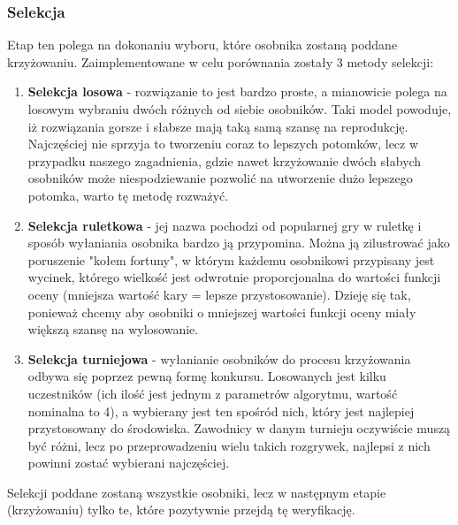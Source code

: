 \subsubsection{Selekcja}
Etap ten polega na dokonaniu wyboru, które osobnika zostaną poddane krzyżowaniu. Zaimplementowane w celu porównania zostały 3 metody selekcji:
\begin{enumerate}
\item \textbf{Selekcja losowa} - rozwiązanie to jest bardzo proste, a mianowicie polega na losowym wybraniu dwóch różnych od siebie osobników. Taki model powoduje, iż rozwiązania gorsze i słabsze mają taką samą szansę na reprodukcję. Najczęściej nie sprzyja to tworzeniu coraz to lepszych potomków, lecz w przypadku naszego zagadnienia, gdzie nawet krzyżowanie dwóch słabych osobników może niespodziewanie pozwolić na utworzenie dużo lepszego potomka, warto tę metodę rozważyć.
\item \textbf{Selekcja ruletkowa} - jej nazwa pochodzi od popularnej gry w ruletkę i sposób wyłaniania osobnika bardzo ją przypomina. Można ją zilustrować jako poruszenie "kołem fortuny", w którym każdemu osobnikowi przypisany jest wycinek, którego wielkość jest odwrotnie proporcjonalna do wartości funkcji oceny (mniejsza wartość kary = lepsze przystosowanie). Dzieję się tak, ponieważ chcemy aby osobniki o mniejszej wartości funkcji oceny miały większą szansę na wylosowanie.
\item \textbf{Selekcja turniejowa} - wyłanianie osobników do procesu krzyżowania odbywa się poprzez pewną formę konkursu. Losowanych jest kilku uczestników (ich ilość jest jednym z parametrów algorytmu, wartość nominalna to 4), a wybierany jest ten spośród nich, który jest najlepiej przystosowany do środowiska. Zawodnicy w danym turnieju oczywiście muszą być różni, lecz po przeprowadzeniu wielu takich rozgrywek, najlepsi z nich powinni zostać wybierani najczęściej.
\end{enumerate}
\par Selekcji poddane zostaną wszystkie osobniki, lecz w następnym etapie (krzyżowaniu) tylko te, które pozytywnie przejdą tę weryfikację.

